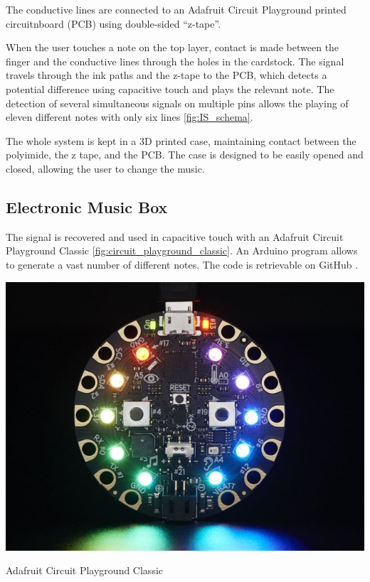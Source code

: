 The conductive lines are connected to an Adafruit Circuit Playground printed circuitnboard (PCB) using double-sided “z-tape”.

When the user touches a note on the top layer, contact is made between the finger and the conductive lines through the holes in the cardstock.
 The signal travels through the ink paths and the z-tape to the PCB, which detects a potential difference using capacitive touch and plays the relevant note. The detection of several simultaneous signals on multiple pins allows the playing of eleven different notes with only six lines \ref{fig:IS_schema}.

The whole system is kept in a 3D printed case, maintaining contact between the polyimide, the z tape, and the PCB. The case is designed to be easily opened and closed, allowing the user to change the music.



\subsection{Electronic Music Box}

The signal is recovered and used in capacitive touch with an Adafruit Circuit Playground Classic \ref{fig:circuit_playground_classic}. An Arduino program allows to generate a vast number of different notes. The code is retrievable on GitHub \cite{adrien2022capacitive_to_notes}.

\begin{marginfigure}
    \centering
    \includegraphics{images/circuit_playground_classic.jpg}
    \caption{Adafruit Circuit Playground Classic}
    \label{fig:circuit_playground_classic}
\end{marginfigure}

